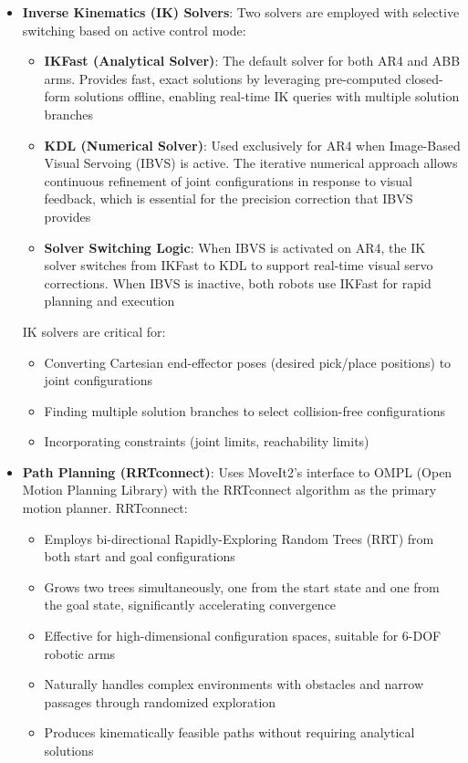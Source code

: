 \begin{itemize}
    \item \textbf{Inverse Kinematics (IK) Solvers}: Two solvers are employed with selective switching based on active control mode:
    \begin{itemize}
        \item \textbf{IKFast (Analytical Solver)}: The default solver for both AR4 and ABB arms. Provides fast, exact solutions by leveraging pre-computed closed-form solutions offline, enabling real-time IK queries with multiple solution branches
        \item \textbf{KDL (Numerical Solver)}: Used exclusively for AR4 when Image-Based Visual Servoing (IBVS) is active. The iterative numerical approach allows continuous refinement of joint configurations in response to visual feedback, which is essential for the precision correction that IBVS provides
        \item \textbf{Solver Switching Logic}: When IBVS is activated on AR4, the IK solver switches from IKFast to KDL to support real-time visual servo corrections. When IBVS is inactive, both robots use IKFast for rapid planning and execution
    \end{itemize}
    
    IK solvers are critical for:
    \begin{itemize}
        \item Converting Cartesian end-effector poses (desired pick/place positions) to joint configurations
        \item Finding multiple solution branches to select collision-free configurations
        \item Incorporating constraints (joint limits, reachability limits)
    \end{itemize}
    
    \item \textbf{Path Planning (RRTconnect)}: Uses MoveIt2's interface to OMPL (Open Motion Planning Library) with the RRTconnect algorithm as the primary motion planner. RRTconnect:
    \begin{itemize}
        \item Employs bi-directional Rapidly-Exploring Random Trees (RRT) from both start and goal configurations
        \item Grows two trees simultaneously, one from the start state and one from the goal state, significantly accelerating convergence
        \item Effective for high-dimensional configuration spaces, suitable for 6-DOF robotic arms
        \item Naturally handles complex environments with obstacles and narrow passages through randomized exploration
        \item Produces kinematically feasible paths without requiring analytical solutions
    \end{itemize}
    

\end{itemize}
